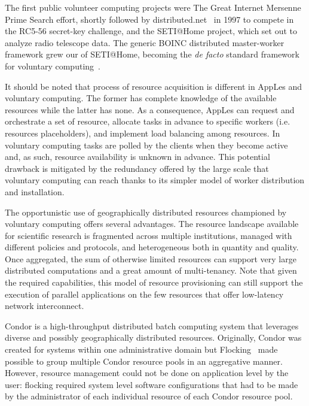 \documentclass{sig-alternate}
\begin{document}
The first public volunteer computing projects were The Great Internet Mersenne
Prime Search effort\cite{woltman:2004:gimps}, shortly followed by
distributed.net~\cite{Lawton:2000:distributednet} in 1997 to compete in the
RC5-56 secret-key challenge, and the SETI@Home project, which set out to analyze
radio telescope data. The generic BOINC distributed master-worker framework grew
our of SETI@Home, becoming the {\it de facto} standard framework for voluntary
computing~\cite{Anderson:2004:BSP:1032646.1033223}.

It should be noted that process of resource acquisition is different in AppLes
and voluntary computing. The former has complete knowledge of the available
resources while the latter has none. As a consequence, AppLes can request and
orchestrate a set of resource, allocate tasks in advance to specific workers
(i.e. resources placeholders), and implement load balancing among resources. In
voluntary computing tasks are polled by the clients when they become active and,
as such, resource availability is unknown in advance. This potential drawback is
mitigated by the redundancy offered by the large scale that voluntary computing
can reach thanks to its simpler model of worker distribution and installation.

The opportunistic use of geographically distributed resources championed by
voluntary computing offers several advantages. The resource landscape available
for scientific research is fragmented across multiple institutions, managed with
different policies and protocols, and heterogeneous both in quantity and
quality. Once aggregated, the sum of otherwise limited resources can support
very large distributed computations and a great amount of multi-tenancy. Note
that given the required capabilities, this model of resource provisioning can
still support the execution of parallel applications on the few resources that
offer low-latency network interconnect.

Condor is a high-throughput distributed batch computing system that leverages
diverse and possibly geographically distributed resources. Originally, Condor
was created for systems within one administrative domain but
Flocking~\cite{Epema:1996:flocking} made possible to group multiple Condor
resource pools in an aggregative manner. However, resource management could not
be done on application level by the user: flocking required system level
software configurations that had to be made by the administrator of each
individual resource of each Condor resource pool.
\end{document}

